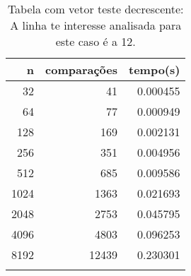 \begin{table}[ht]
\centering
\begin{tabular}{rrr} \toprule
        n &    comparações &       tempo(s) \\ \midrule
      32  &             41 &      0.000455 \\
      64  &             77 &      0.000949 \\
     128  &            169 &      0.002131 \\
     256  &            351 &      0.004956 \\
     512  &            685 &      0.009586 \\
    1024  &           1363 &      0.021693 \\
    2048  &           2753 &      0.045795 \\
    4096  &           4803 &      0.096253 \\
    8192  &          12439 &      0.230301 \\
\bottomrule\addlinespace
\end{tabular}
\caption{Tabela com vetor teste decrescente: A linha te interesse analisada para este caso é a 12.}
\label{tab:quicksortDecrescente}
\end{table}
